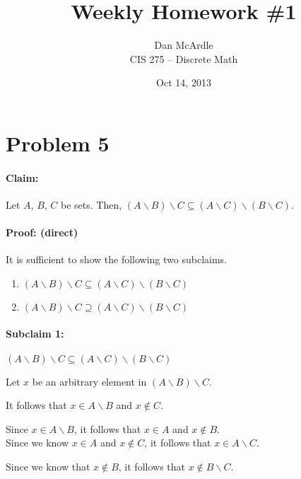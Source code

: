 \documentclass[12pt]{article}
\begin{document}
\title{Weekly Homework \#1}
\author{Dan McArdle\\
CIS 275 -- Discrete Math}
\date{Oct 14, 2013}
\maketitle  %


\newcommand{\bs}{\backslash}

\section*{Problem 5}

\paragraph{Claim:} Let $A$, $B$, $C$ be sets. Then, $(A\bs B)\bs C \subseteq (A\bs C)\bs (B\bs C)$.

\paragraph{Proof: (direct)}

It is sufficient to show the following two subclaims.
\begin{enumerate}
	\item $(A\bs B)\bs C \subseteq (A\bs C)\bs (B\bs C)$
	\item $(A\bs B)\bs C \supseteq (A\bs C)\bs (B\bs C)$
\end{enumerate}

\paragraph{Subclaim 1:} $(A\bs B)\bs C \subseteq (A\bs C)\bs (B\bs C)$

Let $x$ be an arbitrary element in $(A\bs B)\bs C$.

It follows that $x\in A\bs B$ and $x \not \in C$.

Since $x \in A\bs B$, it follows that $x \in A$ and $x \not \in B$.\\


Since we know $x \in A$ and $x \not \in C$, it follows that $x \in A \bs C$.

Since we know that $x \not \in B$, it follows that $x \not \in B\bs C$.\\
\end{document}
